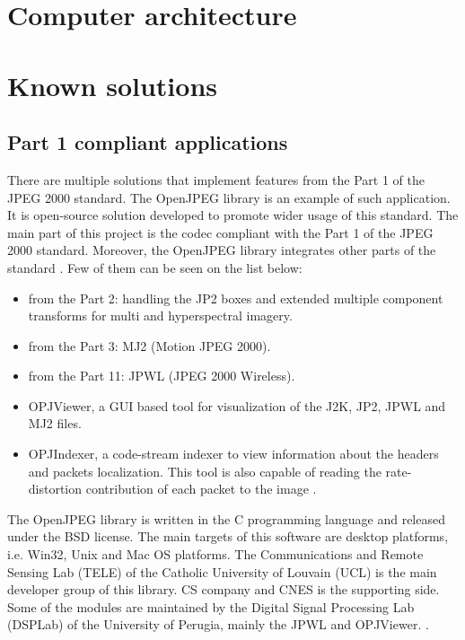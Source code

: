 \section{Computer architecture}

    

\section{Known solutions}

\subsection{Part 1 compliant applications} \label{sec:part_1}

There are multiple solutions that implement features from the Part 1 of the JPEG 2000 standard.
The OpenJPEG library is an example of such application. It is open-source solution developed to
promote wider usage of this standard. The main part of this project is the codec compliant with
the Part 1 of the JPEG 2000 standard. Moreover, the OpenJPEG library integrates other parts
of the standard \cite{jpeg_suite}. Few of them can be seen on the list below:

\begin{itemize}
    \item from the Part 2: handling the JP2 boxes and extended multiple component
    transforms for multi and hyperspectral imagery.
    \item from the Part 3: MJ2 (Motion JPEG 2000).
    \item from the Part 11: JPWL (JPEG 2000 Wireless).
    \item OPJViewer, a GUI based tool for visualization of the J2K, JP2, JPWL and MJ2 files.
    \item OPJIndexer, a code-stream indexer to view information about the headers and packets localization.
    This tool is also capable of reading the rate-distortion contribution of each packet to the image \cite{jpeg_suite}.
\end{itemize}

The OpenJPEG library is written in the C programming language and released under the BSD license.
The main targets of this software are desktop platforms, i.e. Win32, Unix and Mac OS platforms.
The Communications and Remote Sensing Lab (TELE) of the Catholic University of Louvain (UCL)
is the main developer group of this library. CS company and CNES is the supporting side.
Some of the modules are maintained by the Digital Signal Processing Lab (DSPLab) of the University
of Perugia, mainly the JPWL and OPJViewer. \cite{jpeg_suite}.

